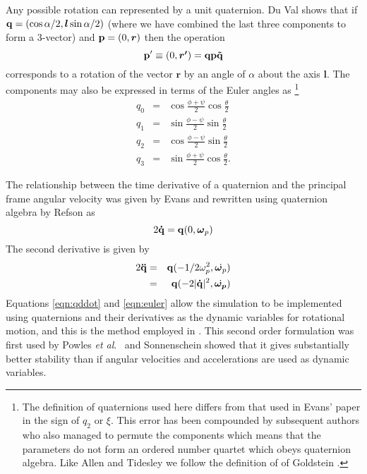 Any possible rotation can represented by a unit quaternion. Du Val shows
\cite{duval:64} that if $ {\bf q} = (\cos \alpha/2, \mbox{\boldmath \protect\(l\protect\)} \sin
\alpha/2) $ (where we have combined the last three components to form
a 3-vector) and ${\bf p} = (0,\mbox{\boldmath \protect\(r\protect\)})$ then the operation
\begin{equation}
{\bf p'} \equiv (0,\mbox{\boldmath \protect\(r'\protect\)}) = {\bf q p \tilde{q}}
\end{equation}
corresponds to a rotation of the vector $\bm{r}$ by an angle of
$\alpha$ about the axis $\bm{l}$.  The components may also be expressed in
terms of the Euler angles as
\footnote{The definition of quaternions used here differs from that used
in Evans' paper \cite[equation 21]{evans:77} in the sign of $q_2$ or
$\xi$.  This error has been compounded by subsequent authors
\cite{sonnenschein:85,smith:82,laakonsen:85} who also managed to 
permute the components which means that the parameters do not form an
ordered number quartet which obeys quaternion algebra. Like Allen and
Tidesley \cite[page 88]{allen:87} we follow the definition of of
Goldstein \cite[pages 143 and 155]{goldstein:80}.}
\begin{eqnarray}
q_0 & = & \cos \frac{\phi+\psi}{2} \cos \frac{\theta}{2} \nonumber \\
q_1 & = & \sin \frac{\phi-\psi}{2} \sin \frac{\theta}{2} \nonumber \\
q_2 & = & \cos \frac{\phi-\psi}{2} \sin \frac{\theta}{2} \nonumber \\
q_3 & = & \sin \frac{\phi+\psi}{2} \cos \frac{\theta}{2}.
\end{eqnarray}

The relationship between the time derivative of a quaternion and the
principal frame angular velocity was given by Evans \cite[Equation
27]{evans:77} and rewritten using quaternion algebra by Refson
\cite{refson:87a} as
\begin{equation}
2 {\bf \dot{q}} = {\bf q}(0,\mbox{\boldmath \protect\(\omega\protect\)}_p)
\label{eqn:qomega}
\end{equation}
The second derivative is given by
\begin{eqnarray}
2{\bf \ddot{q}} & = & {\bf q}(- 1/2 \omega_p^2,\dot{\mbox{\boldmath \protect\(\omega\protect\)}_p}) \\
 & = & {\bf q}(-2 |{\bf \dot{q}}|^2,\dot{\mbox{\boldmath \protect\(\omega_p\protect\)}}) \label{eqn:qddot}
\end{eqnarray}
Equations \ref{eqn:qddot} and \ref{eqn:euler} allow the simulation to
be implemented using quaternions and their derivatives as the dynamic
variables for rotational motion, and this is the method employed in
\moldy.  This second order formulation was first used by Powles {\em et
al}.\ \cite{powles:79} and Sonnenschein showed\cite{sonnenschein:85}
that it gives substantially better stability than if angular
velocities and accelerations are used as dynamic variables.
 
